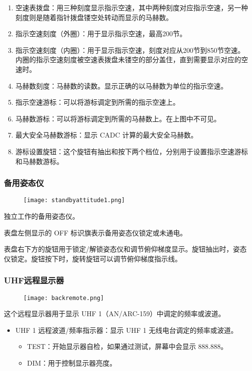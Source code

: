 \begin{enumerate}
	\item 空速表拨盘：用三种刻度显示指示空速，其中两种刻度对应指示空速，另一种刻度则是随着指针拨盘镂空处转动而显示的马赫数。
	\item 指示空速刻度（外圈）：用于显示指示空速，最高200节。
	\item 指示空速刻度（内圈）：用于显示指示空速，刻度对应从200节到850节空速。内圈的指示空速刻度被空速表拨盘未镂空的部分盖住，直到需要显示对应的空速时。
	\item 马赫数刻度：马赫数的读数。显示正确的以马赫数为单位的指示空速。
	\item 指示空速游标：可以将游标调定到所需的指示空速上。
	\item 马赫数游标：可以将游标调定到所需的马赫数上。在上图中不可见。
	\item 最大安全马赫数游标：显示 CADC 计算的最大安全马赫数。
	\item 游标设置旋钮：这个旋钮有抽出和按下两个档位，分别用于设置指示空速游标和马赫数游标。
\end{enumerate}

\subsubsection{备用姿态仪}
\begin{figure}[htb]
	\centering
	\texttt{[image: standbyattitude1.png]}
\end{figure}
独立工作的备用姿态仪。

表盘左侧显示的 OFF 标识旗表示备用姿态仪锁定或未通电。

表盘右下方的旋钮用于锁定/解锁姿态仪和调节俯仰梯度显示。旋钮抽出时，姿态仪锁定。旋钮按下时，旋转旋钮可以调节俯仰梯度指示线。

\subsubsection{UHF远程显示器}
\begin{figure}[htb]
	\centering
	\texttt{[image: backremote.png]}
\end{figure}
这个远程显示器用于显示 UHF 1（AN/ARC-159）中调定的频率或波道。

\begin{itemize}
	\item UHF 1 远程波道/频率指示器：显示 UHF 1 无线电台调定的频率或波道。
	      \begin{itemize}
		      \item TEST：开始显示器自检，如果通过测试，屏幕中会显示 888.888。
		      \item DIM：用于控制显示器亮度。
	      \end{itemize}
\end{itemize}

